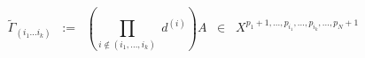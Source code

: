 \begin{equation}
{\tilde{\Gamma}}_{( i_1 ... i_k )} \;\; := \;\; \left( \prod_{i \not\in
( i_1 ,..., i_k )} \; d^{(i)} \right) A \;\; \in \;\; X^{p_1 +1,...,
p_{i_1} ,..., p_{i_k} ,..., p_N +1}
\label{eq:2.6}
\end{equation}

